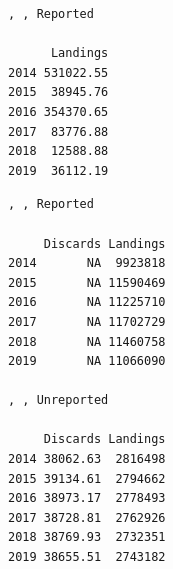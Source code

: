 \documentclass[
  letterpaper,
  oneside,
  open=any]{scrbook}
\newenvironment{Shaded}{\begin{snugshade}}{\end{snugshade}}
\newcommand{\AttributeTok}[1]{\textcolor[rgb]{0.40,0.45,0.13}{#1}}
\newcommand{\CommentTok}[1]{\textcolor[rgb]{0.37,0.37,0.37}{#1}}
\newcommand{\FunctionTok}[1]{\textcolor[rgb]{0.28,0.35,0.67}{#1}}
\newcommand{\NormalTok}[1]{\textcolor[rgb]{0.00,0.23,0.31}{#1}}
\newcommand{\OtherTok}[1]{\textcolor[rgb]{0.00,0.23,0.31}{#1}}
\newcommand{\SpecialCharTok}[1]{\textcolor[rgb]{0.37,0.37,0.37}{#1}}
\newcommand{\StringTok}[1]{\textcolor[rgb]{0.13,0.47,0.30}{#1}}
\begin{document}
\begin{Shaded}
\end{Shaded}

\begin{verbatim}
, , Reported

      Landings
2014 531022.55
2015  38945.76
2016 354370.65
2017  83776.88
2018  12588.88
2019  36112.19
\end{verbatim}

\begin{Shaded}
\end{Shaded}

\begin{verbatim}
, , Reported

     Discards Landings
2014       NA  9923818
2015       NA 11590469
2016       NA 11225710
2017       NA 11702729
2018       NA 11460758
2019       NA 11066090

, , Unreported

     Discards Landings
2014 38062.63  2816498
2015 39134.61  2794662
2016 38973.17  2778493
2017 38728.81  2762926
2018 38769.93  2732351
2019 38655.51  2743182
\end{verbatim}
\end{document}
